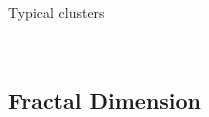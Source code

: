 \documentclass{beamer}
\begin{document}
\begin{frame}{Typical clusters}

\begin{figure}[H]
	\centering
	\\
\end{figure}

\end{frame}

\subsection{Fractal Dimension}
\end{document}
